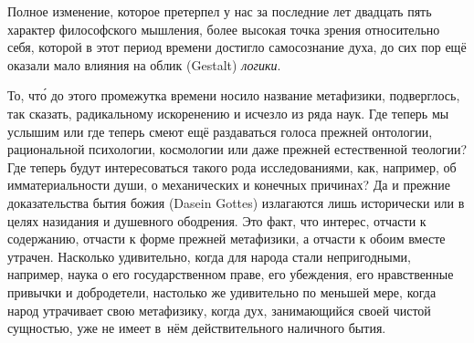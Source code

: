 Полное изменение, которое претерпел у нас за последние лет двадцать пять
характер философского мышления, более высокая точка зрения относительно себя,
которой в этот период времени достигло самосознание духа, до сих пор ещё
оказали мало влияния на облик (Gestalt) {\em логики}.

То, чт\'{о} до этого промежутка времени носило название метафизики,
подверглось, так сказать, радикальному искоренению и исчезло из ряда наук. Где
теперь мы услышим или где теперь смеют ещё раздаваться голоса прежней
онтологии, рациональной психологии, космологии или даже прежней естественной
теологии? Где теперь будут интересоваться такого рода исследованиями, как,
например, об имматериальности души, о механических и конечных причинах? Да и
прежние доказательства бытия божия (Dasein Gottes) излагаются лишь исторически или в целях
назидания и душевного ободрения. Это факт, что интерес, отчасти к
содержанию, отчасти к форме прежней метафизики, а отчасти к обоим вместе
утрачен. Насколько удивительно, когда для народа стали непригодными,
например, наука о его государственном праве, его убеждения,
его нравственные привычки и добродетели, настолько же удивительно по меньшей
мере, когда народ утрачивает свою метафизику, когда дух, занимающийся своей
чистой сущностью, уже не имеет в~нём действительного наличного бытия.

